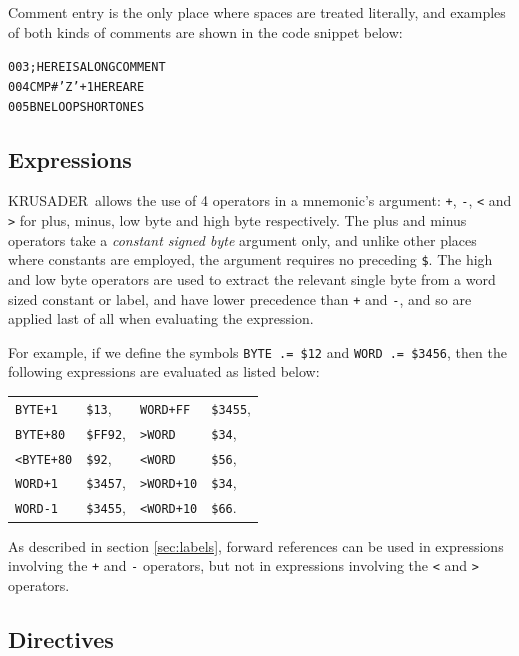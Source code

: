 \documentclass[12pt]{article}
\newcommand{\krusader}{\textsf{KRUSADER}}
\begin{document}
Comment entry is the only place where spaces are treated literally, and examples
of both kinds of comments are shown in the code snippet below:
\begin{alltt}
003 ;      HERE IS A LONG COMMENT
004        CMP #'Z'+1         HERE ARE
005        BNE LOOP           SHORT ONES
\end{alltt}

\subsection{Expressions}
\label{sec:expressions} 

\krusader\ allows the use of 4 operators in a mnemonic's argument: \texttt{+}, \texttt{-},
\texttt{<} and \texttt{>} for plus, minus, low byte and high byte respectively.  The plus and minus operators take a \emph{constant signed byte} argument only, and unlike other
places where constants are employed, the argument requires no preceding \texttt{\$}.
The high and low byte operators are used to extract the relevant single byte from a word sized
constant or label, and have lower precedence than \texttt{+} and \texttt{-}, and so are applied last of all when evaluating the expression.

For example, if we define the symbols 
\texttt{BYTE .= \$12} and \texttt{WORD .= \$3456},
then the following expressions are evaluated as listed below:

\begin{center}
\begin{tabular}{@{$\bullet$~~}l@{~~=~~}l@{\phantom{WWWWWWW}$\bullet$~~}l@{~~=~~}l}
	\texttt{BYTE+1} & \texttt{\$13}, 		& \texttt{WORD+FF} & \texttt{\$3455}, \tabularnewline
	\texttt{BYTE+80} & \texttt{\$FF92}, & \texttt{>WORD} & \texttt{\$34}, 		\tabularnewline
	\texttt{<BYTE+80} & \texttt{\$92},  & \texttt{<WORD} & \texttt{\$56},			\tabularnewline
	\texttt{WORD+1} & \texttt{\$3457},  & \texttt{>WORD+10} & \texttt{\$34},	\tabularnewline
	\texttt{WORD-1} & \texttt{\$3455},  & \texttt{<WORD+10} & \texttt{\$66}.
\end{tabular}
\end{center}

As described in section \ref{sec:labels}, forward references can be used in expressions involving the \texttt{+} and \texttt{-} operators, but not in expressions involving the  \texttt{<} and \texttt{>} operators.

\subsection{Directives}
\label{sec:directives}
\end{document}
